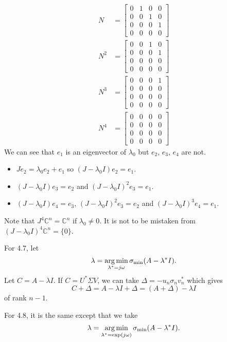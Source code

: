 \begin{solution}
	\begin{align*}
	N & =
	\begin{bmatrix}
	0 & 1 & 0 & 0\\
	0 & 0 & 1 & 0\\
	0 & 0 & 0 & 1\\
	0 & 0 & 0 & 0
	\end{bmatrix}\\
	N^2 & =
	\begin{bmatrix}
	0 & 0 & 1 & 0\\
	0 & 0 & 0 & 1\\
	0 & 0 & 0 & 0\\
	0 & 0 & 0 & 0
	\end{bmatrix}\\
	N^3 & =
	\begin{bmatrix}
	0 & 0 & 0 & 1\\
	0 & 0 & 0 & 0\\
	0 & 0 & 0 & 0\\
	0 & 0 & 0 & 0
	\end{bmatrix}\\
	N^4 & =
	\begin{bmatrix}
	0 & 0 & 0 & 0\\
	0 & 0 & 0 & 0\\
	0 & 0 & 0 & 0\\
	0 & 0 & 0 & 0
	\end{bmatrix}
	\end{align*}
	We can see that $e_1$ is an eigenvector of $\lambda_0$ but
	$e_2$, $e_3$, $e_4$ are not.
	\begin{itemize}
		\item $Je_2 = \lambda_0 e_2 + e_1$
		so $(J - \lambda_0 I)e_2 = e_1$.
		\item $(J - \lambda_0 I)e_3 = e_2$ and $(J - \lambda_0 I)^2e_3 = e_1$.
		\item $(J - \lambda_0 I)e_4 = e_3$, $(J - \lambda_0 I)^2e_3 = e_2$
		and $(J - \lambda_0 I)^3e_4 = e_1$.
	\end{itemize}
	
	Note that $J^4 \mathbb{C}^n = \mathbb{C}^n$ if $\lambda_0 \neq 0$.
	It is not to be mistaken from $(J - \lambda_0 I)^4 \mathbb{C}^n = \{0\}$.
\end{solution}

\begin{solution}
	For 4.7, let
	\[ \lambda = \operatorname*{arg\,min}_{\lambda^* = j\omega} \sigma_{\mathrm{min}}(A - \lambda^*I). \]
	Let $C = A - \lambda I$.
	If $C = U^* \Sigma V$, we can take $\Delta = -u_n \sigma_n v_n^*$ which gives
	\[ C + \Delta = A - \lambda I + \Delta = (A + \Delta) - \lambda I \]
	of rank $n-1$.
	
	For 4.8, it is the same except that we take
	\[ \lambda = \operatorname*{arg\,min}_{\lambda^* = \exp(j\omega)} \sigma_{\mathrm{min}}(A - \lambda^*I). \]
\end{solution}
